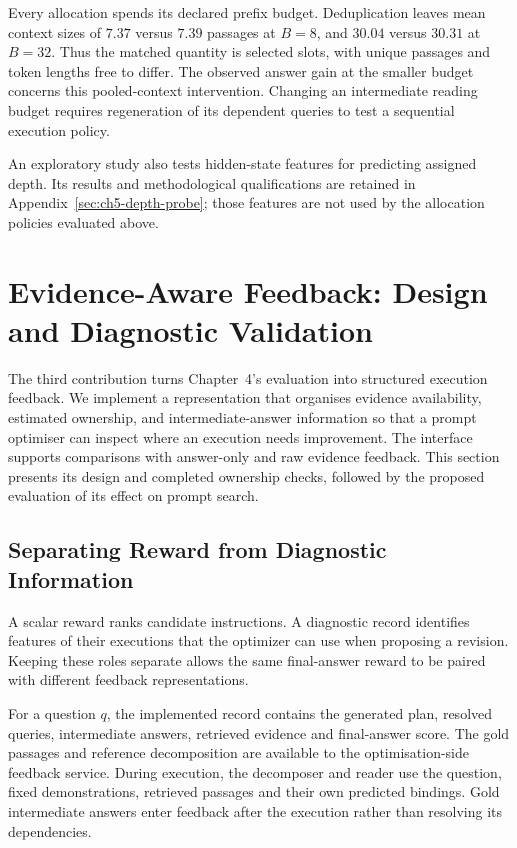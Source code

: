 Every allocation spends its declared prefix budget. Deduplication leaves
mean context sizes of $7.37$ versus $7.39$ passages at $B=8$, and $30.04$
versus $30.31$ at $B=32$. Thus the matched quantity is selected slots,
with unique passages and token lengths free to differ. The observed answer
gain at the smaller budget concerns this pooled-context intervention.
Changing an intermediate reading budget requires regeneration of its
dependent queries to test a sequential execution policy.

An exploratory study also tests hidden-state features for predicting assigned
depth. Its results and methodological qualifications are retained in
Appendix~\ref{sec:ch5-depth-probe}; those features are not used by the
allocation policies evaluated above.

\section{Evidence-Aware Feedback: Design and Diagnostic Validation}
\label{sec:ch5-feedback}

The third contribution turns Chapter~4's evaluation into structured execution
feedback. We implement a representation that organises evidence availability,
estimated ownership, and intermediate-answer information so that a prompt
optimiser can inspect where an execution needs improvement. The interface
supports comparisons with answer-only and raw evidence feedback. This section
presents its design and completed ownership checks, followed by the proposed
evaluation of its effect on prompt search.

\subsection{Separating Reward from Diagnostic Information}

A scalar reward ranks candidate instructions. A diagnostic record identifies
features of their executions that the optimizer can use when proposing a
revision. Keeping these roles separate allows the same final-answer reward
to be paired with different feedback representations.

For a question $q$, the implemented record contains the generated plan, resolved
queries, intermediate answers, retrieved evidence and final-answer score.
The gold passages and reference decomposition are available to the
optimisation-side feedback service. During execution, the decomposer and
reader use the question, fixed demonstrations, retrieved passages and their
own predicted bindings. Gold intermediate answers enter feedback after the
execution rather than resolving its dependencies.

